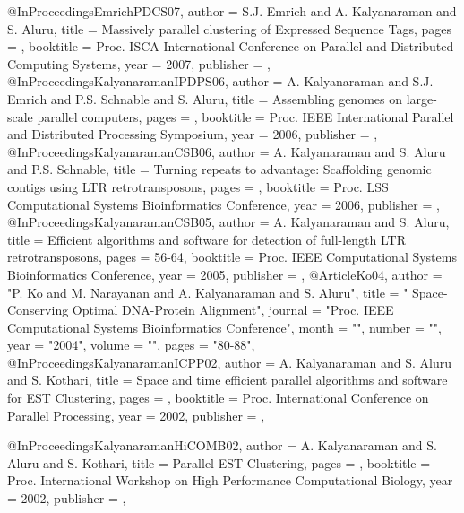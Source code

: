 
@InProceedings{EmrichPDCS07,
  author =       {S.J. Emrich and A. Kalyanaraman and S. Aluru},
  title =        {Massively parallel clustering of Expressed Sequence Tags},
  pages =        {},
  booktitle =    {Proc. ISCA International Conference on Parallel and Distributed Computing Systems},
  year =         {2007},
  publisher =    {},
}
@InProceedings{KalyanaramanIPDPS06,
  author =       {A. Kalyanaraman and S.J. Emrich and P.S. Schnable and S. Aluru},
  title =        {Assembling genomes on large-scale parallel computers},
  pages =        {},
  booktitle =    {Proc. IEEE International Parallel and Distributed Processing Symposium},
  year =         {2006},
  publisher =    {},
}
@InProceedings{KalyanaramanCSB06,
  author =       {A. Kalyanaraman and S. Aluru and P.S. Schnable},
  title =        {{Turning repeats to advantage: Scaffolding genomic contigs using LTR retrotransposons}},
  pages =        {},
  booktitle =    {Proc. LSS Computational Systems Bioinformatics Conference},
  year =         {2006},
  publisher =    {},
}
@InProceedings{KalyanaramanCSB05,
  author =       {A. Kalyanaraman and S. Aluru},
  title =        {{Efficient algorithms and software for detection of full-length LTR retrotransposons}},
  pages =        {56-64},
  booktitle =    {Proc. IEEE Computational Systems Bioinformatics Conference},
  year =         {2005},
  publisher =    {},
}
@Article{Ko04,
   author =   "P. Ko and M. Narayanan and A. Kalyanaraman and S. Aluru",
   title =   " Space-Conserving Optimal {DNA}-Protein Alignment",
   journal =   "Proc. IEEE Computational Systems Bioinformatics Conference",
   month = "",
   number = "",
   year =   "2004",
   volume =   "",
   pages =   "80-88",
}
@InProceedings{KalyanaramanICPP02,
  author =       {A. Kalyanaraman and S. Aluru and S. Kothari},
  title =        {Space and time efficient parallel algorithms and software for {EST} Clustering},
  pages =        {},
  booktitle =    {Proc. International Conference on Parallel Processing},
  year =         {2002},
  publisher =    {},
}

@InProceedings{KalyanaramanHiCOMB02,
  author =       {A. Kalyanaraman and S. Aluru and S. Kothari},
  title =        {Parallel {EST} Clustering},
  pages =        {},
  booktitle =    {Proc. International Workshop on High Performance Computational Biology},
  year =         {2002},
  publisher =    {},
}

